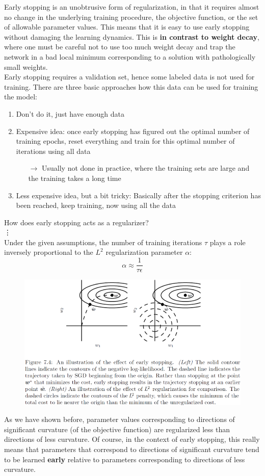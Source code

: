 \begin{multicols}{2}
	Early stopping is an unobtrusive form of regularization, in that it requires almost no change in the underlying training procedure, the objective function, or the set of allowable parameter values.
	This means that it is easy to use early stopping without damaging the learning dynamics.
	This is \textbf{in contrast to weight decay}, where one must be careful not to use too much weight decay and trap the network in a bad local minimum corresponding to a solution with pathologically small weights.\\
	
	Early stopping requires a validation set, hence some labeled data is not used for training.
	There are three basic approaches how this data can be used for training the model:
	\begin{enumerate}
		\item Don’t do it, just have enough data
		\item Expensive idea: once early stopping has figured out the optimal number of training epochs, reset everything and train for this optimal number of iterations using all data
		\begin{itemize}
			\item[$\rightarrow$] Usually not done in practice, where the training sets are large and the training takes a long time
		\end{itemize}
		\item Less expensive idea, but a bit tricky: Basically after the stopping criterion has been reached, keep training, now using all the data
	\end{enumerate}
	How does early stopping acts as a regularizer?\\
	\vdots\\
	Under the given assumptions, the number of training iterations $\tau$ plays a role inversely proportional to the $L^2$ regularization parameter $\alpha$:
	\[ \alpha \approx \frac{1}{\tau\epsilon} \]
	\begin{figure}[H]
		\centering
		\includegraphics[width=1\linewidth]{images/earlyvsl2.png}
	\end{figure}
	As we have shown before, parameter values corresponding to directions of significant curvature (of the objective function) are regularized less than directions of less curvature. Of course, in the context of early stopping, this really means that parameters that correspond to directions of significant curvature tend to be learned \textbf{early} relative to parameters corresponding to directions of less curvature.

\end{multicols}
